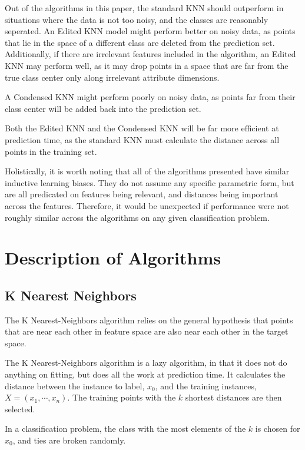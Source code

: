 \documentclass{amsart}
\begin{document}
    Out of the algorithms in this paper, the standard KNN should outperform in situations
    where the data is not too noisy, and the classes are reasonably seperated. An Edited KNN
    model might perform better on noisy data, as points that lie in the space of a different
    class are deleted from the prediction set. Additionally, if there are irrelevant
    features included in the algorithm, an Edited KNN may perform well, as it may drop points in
    a space that are far from the true class center only along irrelevant attribute dimensions.

    A Condensed KNN might perform poorly on noisy
    data, as points far from their class center will be added back into the prediction set.

    Both the Edited KNN and the Condensed KNN will be far more efficient at prediction time, as
    the standard KNN must calculate the distance across all points in the training set.

    Holistically, it is worth noting that all of the algorithms presented have similar inductive learning biases. They
    do not assume any specific parametric form, but are all predicated on features being relevant, and distances being important
    across the features. Therefore, it would be unexpected if performance were not roughly similar across the algorithms
    on any given classification problem.

    \section{Description of Algorithms}
    \subsection*{K Nearest Neighbors}
    The K Nearest-Neighbors algorithm\cite{knn} relies on the general hypothesis that points
    that are near each other in feature space are also near each other in the target space.

    The K Nearest-Neighbors algorithm is a lazy algorithm, in that it does not
    do anything on fitting, but does all the work at prediction time. It calculates the
    distance between the instance to label, $x_0$, and the training instances, $X = (x_1, \cdots, x_n)$.
    The training points with the $k$ shortest distances are then selected.

    In a classification  problem, the class with the most elements of the $k$ is chosen for $x_0$,
    and ties are broken randomly.
\end{document}

